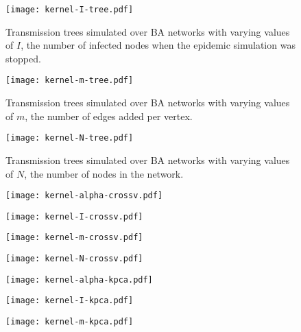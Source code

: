 \begin{figure}
  \centering
  \texttt{[image: kernel-I-tree.pdf]}
  \caption{
    Transmission trees simulated over \gls{BA} networks with varying values of
    $I$, the number of infected nodes when the epidemic simulation was stopped.
  }
  \label{fig:Itrees}
\end{figure}

\begin{figure}
  \centering
  \texttt{[image: kernel-m-tree.pdf]}
  \caption{
    Transmission trees simulated over \gls{BA} networks with varying values of
    $m$, the number of edges added per vertex.
  }
  \label{fig:mtrees}
\end{figure}

\begin{figure}
  \centering
  \texttt{[image: kernel-N-tree.pdf]}
  \caption{
    Transmission trees simulated over \gls{BA} networks with varying values of
    $N$, the number of nodes in the network.
  }
  \label{fig:Ntrees}
\end{figure}

\begin{figure}
  \centering
  \texttt{[image: kernel-alpha-crossv.pdf]}
  \label{fig:alphacrossv}
\end{figure}

\begin{figure}
  \centering
  \texttt{[image: kernel-I-crossv.pdf]}
  \label{fig:Icrossv}
\end{figure}

\begin{figure}
  \centering
  \texttt{[image: kernel-m-crossv.pdf]}
  \label{fig:mcrossv}
\end{figure}

\begin{figure}
  \centering
  \texttt{[image: kernel-N-crossv.pdf]}
  \label{fig:Ncrossv}
\end{figure}

\begin{figure}
  \centering
  \texttt{[image: kernel-alpha-kpca.pdf]}
  \label{fig:alphakpca}
\end{figure}

\begin{figure}
  \centering
  \texttt{[image: kernel-I-kpca.pdf]}
  \label{fig:Ikpca}
\end{figure}

\begin{figure}
  \centering
  \texttt{[image: kernel-m-kpca.pdf]}
  \label{fig:mkpca}
\end{figure}

